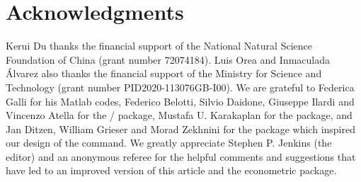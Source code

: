 \section{Acknowledgments}
\vspace{5pt}
Kerui Du thanks the financial support of the National Natural Science Foundation of China (grant number 72074184). Luis Orea and Inmaculada Álvarez also thanks the financial support of the Ministry for Science and Technology  (grant number PID2020-113076GB-I00). We are grateful to Federica Galli for his Matlab codes, Federico Belotti, Silvio Daidone, Giuseppe Ilardi and Vincenzo Atella for the / package, Mustafa U. Karakaplan for the  package, and Jan Ditzen, William Grieser and Morad Zekhnini for the  package which inspired our design of the  command. We greatly appreciate Stephen P. Jenkins (the editor) and an anonymous referee for the helpful comments and suggestions that have led to an improved version of this article and the econometric package.



\endinput
